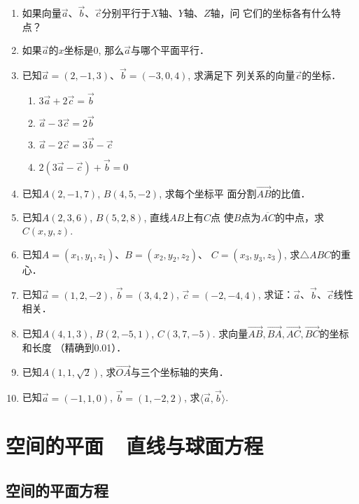 \begin{enumerate}
    \item 如果向量$\vec{a}$、$\vec{b}$、$\vec{c}$分别平行于$X$轴、$Y$轴、$Z$轴，问
    它们的坐标各有什么特点？
    \item 
    如果$\vec{a}$的$x$坐标是0, 那么$\vec{a}$与哪个平面平行．
    \item 已知$\vec{a}=(2,-1,3)$、$\vec{b}=(-3,0,4)$, 求满足下
    列关系的向量$\vec{c}$的坐标．
\begin{multicols}{2}
\begin{enumerate}
    \item $3\vec{a}+2\vec{c}=\vec{b}$
    \item $\vec{a}-3\vec{c}=2\vec{b}$
    \item $\vec{a}-2\vec{c}=3\vec{b}-\vec{c}$
    \item $2(3\vec{a}-\vec{c})+\vec{b}=0$
\end{enumerate}
\end{multicols}
    \item 已知$A(2,-1,7)$, $B(4,5,-2)$, 求每个坐标平
    面分割$\Vec{AB}$的比值．
    \item 已知$A(2,3,6)$, $B(5,2,8)$, 直线$AB$上有$C$点
    使$B$点为$\overline{AC}$的中点，求$C(x,y,z)$.
    \item 已知$A=(x_1,y_1,z_1)$、$B=(x_2,y_2,z_2)$、
    $C=(x_3,y_3,z_3)$, 求$\triangle ABC$的重心．

    \item 已知$\vec{a}=(1,2,-2)$, $\vec{b}=(3,4,2)$,
    $\vec{c}=(-2,-4,4)$, 求证：$\vec{a}$、$\vec{b}$、$\vec{c}$线性相关．

    \item 已知$A(4,1,3)$, $B(2,-5,1)$, $C(3,7,-5)$. 求向量$\Vec{AB},\Vec{BA},\Vec{AC},\Vec{BC}$的坐标和长度
    （精确到0.01）．
    \item 已知$A(1,1,\sqrt{2})$, 求$\Vec{OA}$与三个坐标轴的夹角．
    \item 已知$\vec{a}=(-1,1,0)$, $\vec{b}=(1,-2,2)$,
    求$\langle \vec{a},\vec{b}\rangle$.
\end{enumerate}

\section{空间的平面~~直线与球面方程}

\subsection{空间的平面方程}

